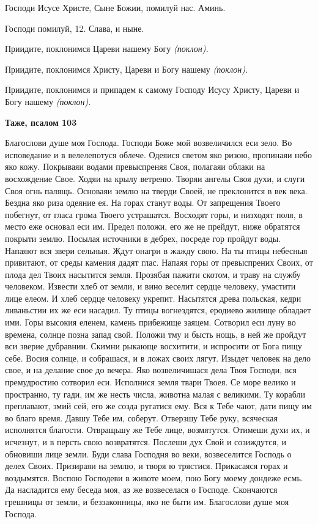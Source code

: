 Господи Исусе Христе, Сыне Божии, помилуй нас. Аминь.


Господи помилуй, 12. Слава, и ныне.


Приидите, поклонимся Цареви нашему Богу \itshape (поклон)\normalfont{}.


Приидите, поклонимся Христу, Цареви и Богу нашему \itshape (поклон)\normalfont{}.


Приидите, поклонимся и припадем к самому Господу Исусу Христу, Цареви и Богу нашему \itshape (поклон)\normalfont{}.





\bfseries Таже, псалом 103\normalfont{}


Благослови душе моя Господа. Господи Боже мой возвеличился еси зело. Во исповедание и в велелепотуся облече. Одеяися светом яко ризою, пропинаяи небо яко кожу. Покрываяи водами превыспреняя Своя, полагаяи облаки на восхождение Свое. Ходяи на крылу ветреню. Творяи ангелы Своя духи, и слуги Своя огнь палящь. Основаяи землю на тверди Своей, не преклонится в век века. Бездна яко риза одеяние ея. На горах станут воды. От запрещения Твоего побегнут, от гласа грома Твоего устрашатся. Восходят горы, и низходят поля, в место еже основал еси им. Предел положи, его же не прейдут, ниже обратятся покрыти землю. Посылая источники в дебрех, посреде гор пройдут воды. Напаяют вся звери сельныя. Ждут онагри в жажду свою. На ты птицы небесныя привитают, от среды камения дадят глас. Напаяя горы от превыспрених Своих, от плода дел Твоих насытится земля. Прозябая пажити скотом, и траву на службу человеком. Извести хлеб от земли, и вино веселит сердце человеку, умастити лице елеом. И хлеб сердце человеку укрепит. Насытятся древа польская, кедри ливаньстии их же еси насадил. Ту птицы вогнездятся, еродиево жилище обладает ими. Горы высокия еленем, камень прибежище заяцем. Сотворил еси луну во времена, солнце позна запад свой. Положи тму и бысть нощь, в ней же пройдут вси зверие дубравнии. Скимни рыкающе восхитити, и испросити от Бога пищу себе. Восия солнце, и собрашася, и в ложах своих лягут. Изыдет человек на дело свое, и на делание свое до вечера. Яко возвеличишася дела Твоя Господи, вся премудростию сотворил еси. Исполнися земля твари Твоея. Се море велико и пространно, ту гади, им же несть числа, животна малая с великими. Ту корабли преплавают, змий сей, его же созда ругатися ему. Вся к Тебе чают, дати пищу им во благо время. Давшу Тебе им, соберут. Отверзшу Тебе руку, всяческая исполнятся благости. Отвращьшу же Тебе лице, возмятутся. Отимеши духи их, и исчезнут, и в персть свою возвратятся. Послеши дух Свой и созиждутся, и обновиши лице земли. Буди слава Господня во веки, возвеселится Господь о делех Своих. Призираяи на землю, и творя ю трястися. Прикасаяся горах и воздымятся. Воспою Господеви в животе моем, пою Богу моему дондеже есмь. Да насладится ему беседа моя, аз же возвеселася о Господе. Скончаются грешницы от земли, и беззаконницы, яко не быти им. Благослови душе моя Господа.


